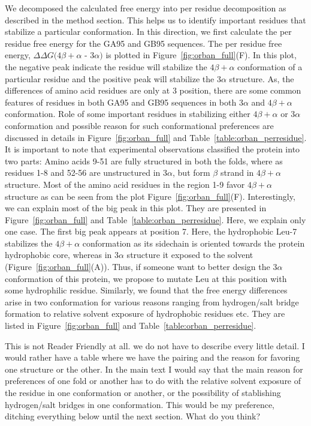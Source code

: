 \documentclass[12pt]{article}
\newcommand{\Alberto}[1]{\color{ForestGreen}#1\normalcolor }
\begin{document}
We decomposed the calculated free energy into per residue decomposition as described in the method
section. This helps us to identify important residues that stabilize a particular conformation. 
In this direction, we first calculate the per residue free energy for the GA95 and GB95 sequences. 
The per residue free energy, $\Delta \Delta G (4 \beta + \alpha$ - $3 \alpha)$ is plotted in Figure~\ref{fig:orban_full}(F).
In this plot, the negative peak indicate the residue will stabilize the $4 \beta + \alpha$ conformation of a particular
residue and the positive peak will stabilize the $3 \alpha$ structure. As, the differences of amino acid
residues are only at 3 position, there are some common features of residues in both GA95 and GB95 sequences in both
$3 \alpha$ and $4 \beta + \alpha$ conformation. Role of some important residues in stabilizing either 
$4 \beta + \alpha$ or $3 \alpha$ conformation and possible reason for such conformational preferences are discussed in 
details in Figure~\ref{fig:orban_full} and Table~\ref{table:orban_perresidue}. It is important to note that
experimental observations classified the protein into two parts: Amino acids 9-51 are fully structured in both
the folds, where as residues 1-8 and 52-56 are unstructured in $3 \alpha$, but form $\beta$ strand in $4 \beta + \alpha$ structure.
Most of the amino acid residues in the region 1-9 favor $4 \beta + \alpha$ structure as can be seen from the plot
Figure~\ref{fig:orban_full}(F). Interestingly, we can explain most of the big peak in this plot. They are presented 
in Figure~\ref{fig:orban_full} and Table~\ref{table:orban_perresidue}. Here, we explain only one case. The first big peak
appears at position 7. Here, the hydrophobic Leu-7 stabilizes the $4 \beta + \alpha$ conformation as its sidechain is oriented 
towards the protein hydrophobic core, whereas in $3 \alpha$ structure it exposed to the solvent (Figure~\ref{fig:orban_full}(A)).
Thus, if someone want to better design the $3 \alpha$ conformation of this protein, we propose to mutate Leu at this position
with some hydrophilic residue. Similarly, we found that the free energy differences arise in two conformation for various 
reasons ranging from hydrogen/salt bridge formation to relative solvent exposure of hydrophobic residues etc. They are 
listed in Figure~\ref{fig:orban_full} and Table~\ref{table:orban_perresidue}.     


\Alberto{This is not Reader Friendly at all. we do not have to describe every little detail. I would
    rather have a table where we have the pairing and the reason for favoring one structure or the
    other. In the main text I would say that the main reason for preferences of one fold or another
    has to do with the relative solvent exposure of the residue in one conformation or another, or
    the possibility of stablishing hydrogen/salt bridges in one conformation. This would be my
preference, ditching everything below until the next section. What do you think?}
\end{document}

